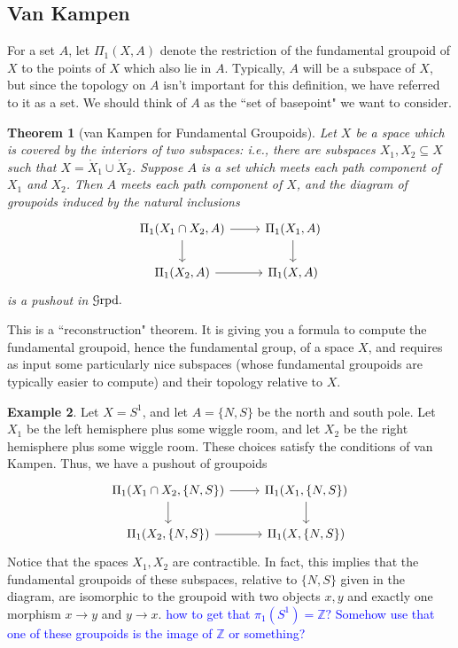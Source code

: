 \documentclass[10pt]{amsart}
\newcommand{\euscr}[1]{\EuScript{#1}}
\newtheorem{thm}{Theorem}[section]
\theoremstyle{definition}
\newtheorem{ex}[thm]{Example}
\begin{document}
\subsection{Van Kampen}
For a set $A$, let $\Pi_1(X, A)$ denote the restriction of the fundamental groupoid of $X$ to the points of $X$ which also lie in $A$. Typically, $A$ will be a subspace of $X$, but since the topology on $A$ isn't important for this definition, we have referred to it as a set. We should think of $A$ as the ``set of basepoint" we want to consider.

\begin{thm}[van Kampen for Fundamental Groupoids]
    Let $X$ be a space which is covered by the interiors of two subspaces: i.e., there are subspaces $X_1, X_2 \subseteq X$ such that $X = \mathring{X}_1 \cup \mathring{X}_2$. Suppose $A$ is a set which meets each path component of $X_1$ and $X_2$. Then $A$ meets each path component of $X$, and the diagram of groupoids induced by the natural inclusions
    \[\begin{tikzcd}
	{\Pi_1(X_1 \cap X_2, A)} & {\Pi_1(X_1, A)} \\
	{\Pi_1(X_2, A)} & {\Pi_1(X, A)}
	\arrow[from=1-1, to=1-2]
	\arrow[from=1-1, to=2-1]
	\arrow[from=1-2, to=2-2]
	\arrow[from=2-1, to=2-2]
    \end{tikzcd}\]
    is a pushout in $\euscr{G}\mathrm{rpd}.$
\end{thm}
This is a ``reconstruction" theorem. It is giving you a formula to compute the fundamental groupoid, hence the fundamental group, of a space $X$, and requires as input some particularly nice subspaces (whose fundamental groupoids are typically easier to compute) and their topology relative to $X$. 

\begin{ex}
    Let $X=S^1$, and let $A = \{N, S\}$ be the north and south pole. Let $X_1$ be the left hemisphere plus some wiggle room, and let $X_2$ be the right hemisphere plus some wiggle room. These choices satisfy the conditions of van Kampen. Thus, we have a pushout of groupoids
    \[\begin{tikzcd}
	{\Pi_1(X_1 \cap X_2, \{N, S\})} & {\Pi_1(X_1, \{N, S\})} \\
	{\Pi_1(X_2, \{N,S\})} & {\Pi_1(X, \{N,S\})}
	\arrow[from=1-1, to=1-2]
	\arrow[from=1-1, to=2-1]
	\arrow[from=1-2, to=2-2]
	\arrow[from=2-1, to=2-2]
    \end{tikzcd}\]
    Notice that the spaces $X_1, X_2$ are contractible. In fact, this implies that the fundamental groupoids of these subspaces, relative to $\{N, S\}$ given in the diagram, are isomorphic to the groupoid with two objects $x, y$ and exactly one morphism $x \to y$ and $y \to x$. \textcolor{blue}{how to get that $\pi_1(S^1)=\mathbb{Z}?$ Somehow use that one of these groupoids is the image of $\mathbb{Z}$ or something?}
\end{ex}
\end{document}
